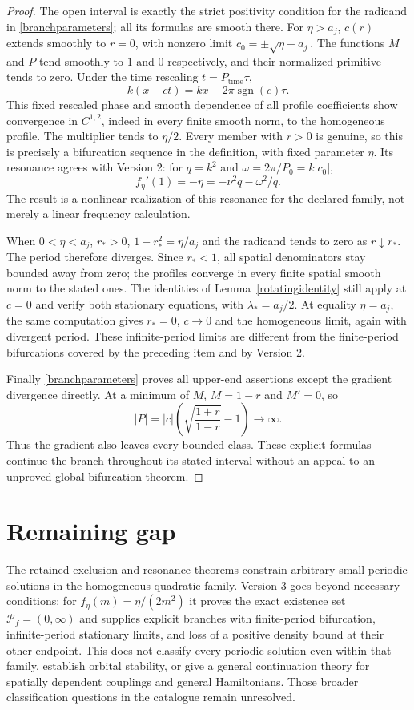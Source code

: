 \documentclass[11pt]{article}
\begin{document}
\begin{proof}
The open interval is exactly the strict positivity condition for the
radicand in \eqref{branchparameters}; all its formulas are smooth there.
For $\eta>a_j$, $c(r)$ extends smoothly to $r=0$, with nonzero limit
$c_0=\pm\sqrt{\eta-a_j}$. The functions $M$ and $P$ tend smoothly
to $1$ and $0$ respectively, and their normalized primitive tends to
zero. Under the time rescaling $t=P_{\mathrm{time}}\tau$,
\[
 k(x-ct)=kx-2\pi\operatorname{sgn}(c)\tau.
\]
This fixed rescaled phase and smooth dependence of all profile
coefficients show convergence in $C^{1,2}$, indeed in every finite
smooth norm, to the homogeneous profile. The multiplier tends to
$\eta/2$. Every member with $r>0$ is genuine, so this is precisely a
bifurcation sequence in the definition, with fixed parameter $\eta$.
Its resonance agrees with Version 2: for $q=k^2$ and
$\omega=2\pi/P_0=k|c_0|$,
\[
 f_\eta'(1)=-\eta=-\nu^2q-\omega^2/q.
\]
The result is a nonlinear realization of this resonance for the declared
family, not merely a linear frequency calculation.

When $0<\eta<a_j$, $r_*>0$,
$1-r_*^2=\eta/a_j$ and the radicand tends to zero as
$r\downarrow r_*$. The period therefore diverges. Since $r_*<1$,
all spatial denominators stay bounded away from zero; the profiles
converge in every finite spatial smooth norm to the stated ones.
The identities of Lemma~\ref{rotatingidentity} still apply at $c=0$
and verify both stationary equations, with $\lambda_*=a_j/2$.
At equality $\eta=a_j$, the same computation gives $r_*=0$,
$c\to0$ and the homogeneous limit, again with divergent period.
These infinite-period limits are different from the finite-period
bifurcations covered by the preceding item and by Version 2.

Finally \eqref{branchparameters} proves all upper-end assertions except
the gradient divergence directly. At a minimum of $M$, $M=1-r$ and
$M'=0$, so
\[
 |P|=|c|\left(\sqrt{\frac{1+r}{1-r}}-1\right)\longrightarrow\infty.
\]
Thus the gradient also leaves every bounded class. These explicit
formulas continue the branch throughout its stated interval without an
appeal to an unproved global bifurcation theorem.
\end{proof}

\section{Remaining gap}
The retained exclusion and resonance theorems constrain arbitrary small
periodic solutions in the homogeneous quadratic family. Version 3 goes
beyond necessary conditions: for $f_\eta(m)=\eta/(2m^2)$ it proves the
exact existence set $\mathcal P_f=(0,\infty)$ and supplies explicit
branches with finite-period bifurcation, infinite-period stationary limits,
and loss of a positive density bound at their other endpoint. This does
not classify every periodic solution even within that family, establish
orbital stability, or give a general continuation theory for spatially
dependent couplings and general Hamiltonians. Those broader classification
questions in the catalogue remain unresolved.
\end{document}
